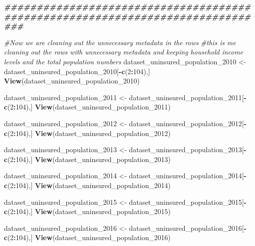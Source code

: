 \documentclass[
]{article}
\newenvironment{Shaded}{\begin{snugshade}}{\end{snugshade}}
\newcommand{\CommentTok}[1]{\textcolor[rgb]{0.56,0.35,0.01}{\textit{#1}}}
\newcommand{\DecValTok}[1]{\textcolor[rgb]{0.00,0.00,0.81}{#1}}
\newcommand{\DocumentationTok}[1]{\textcolor[rgb]{0.56,0.35,0.01}{\textbf{\textit{#1}}}}
\newcommand{\FunctionTok}[1]{\textcolor[rgb]{0.13,0.29,0.53}{\textbf{#1}}}
\newcommand{\NormalTok}[1]{#1}
\newcommand{\OtherTok}[1]{\textcolor[rgb]{0.56,0.35,0.01}{#1}}
\newcommand{\SpecialCharTok}[1]{\textcolor[rgb]{0.81,0.36,0.00}{\textbf{#1}}}
\begin{document}
\begin{Shaded}
\begin{Highlighting}[]
\DocumentationTok{\#\#\#\#\#\#\#\#\#\#\#\#\#\#\#\#\#\#\#\#\#\#\#\#\#\#\#\#\#\#\#\#\#\#\#\#\#\#\#\#\#\#\#\#\#\#\#\#\#\#\#\#\#\#\#\#\#\#\#\#\#\#\#\#\#\#\#\#\#\#\#\#\#\#\#\#\#\#\#}

\CommentTok{\#Now we are cleaning out the unnecessary metadata in the rows}
\CommentTok{\#this is me cleaning out the rows with unnecessary metadata and keeping household income levels and the total population numbers}
\NormalTok{dataset\_uninsured\_population\_2010 }\OtherTok{\textless{}{-}}\NormalTok{ dataset\_uninsured\_population\_2010[}\SpecialCharTok{{-}}\FunctionTok{c}\NormalTok{(}\DecValTok{2}\SpecialCharTok{:}\DecValTok{104}\NormalTok{),]}
\FunctionTok{View}\NormalTok{(dataset\_uninsured\_population\_2010)}

\NormalTok{dataset\_uninsured\_population\_2011 }\OtherTok{\textless{}{-}}\NormalTok{ dataset\_uninsured\_population\_2011[}\SpecialCharTok{{-}}\FunctionTok{c}\NormalTok{(}\DecValTok{2}\SpecialCharTok{:}\DecValTok{104}\NormalTok{),]}
\FunctionTok{View}\NormalTok{(dataset\_uninsured\_population\_2011)}

\NormalTok{dataset\_uninsured\_population\_2012 }\OtherTok{\textless{}{-}}\NormalTok{ dataset\_uninsured\_population\_2012[}\SpecialCharTok{{-}}\FunctionTok{c}\NormalTok{(}\DecValTok{2}\SpecialCharTok{:}\DecValTok{104}\NormalTok{),]}
\FunctionTok{View}\NormalTok{(dataset\_uninsured\_population\_2012)}

\NormalTok{dataset\_uninsured\_population\_2013 }\OtherTok{\textless{}{-}}\NormalTok{ dataset\_uninsured\_population\_2013[}\SpecialCharTok{{-}}\FunctionTok{c}\NormalTok{(}\DecValTok{2}\SpecialCharTok{:}\DecValTok{104}\NormalTok{),]}
\FunctionTok{View}\NormalTok{(dataset\_uninsured\_population\_2013)}

\NormalTok{dataset\_uninsured\_population\_2014 }\OtherTok{\textless{}{-}}\NormalTok{ dataset\_uninsured\_population\_2014[}\SpecialCharTok{{-}}\FunctionTok{c}\NormalTok{(}\DecValTok{2}\SpecialCharTok{:}\DecValTok{104}\NormalTok{),]}
\FunctionTok{View}\NormalTok{(dataset\_uninsured\_population\_2014)}

\NormalTok{dataset\_uninsured\_population\_2015 }\OtherTok{\textless{}{-}}\NormalTok{ dataset\_uninsured\_population\_2015[}\SpecialCharTok{{-}}\FunctionTok{c}\NormalTok{(}\DecValTok{2}\SpecialCharTok{:}\DecValTok{104}\NormalTok{),]}
\FunctionTok{View}\NormalTok{(dataset\_uninsured\_population\_2015)}

\NormalTok{dataset\_uninsured\_population\_2016 }\OtherTok{\textless{}{-}}\NormalTok{ dataset\_uninsured\_population\_2016[}\SpecialCharTok{{-}}\FunctionTok{c}\NormalTok{(}\DecValTok{2}\SpecialCharTok{:}\DecValTok{104}\NormalTok{),]}
\FunctionTok{View}\NormalTok{(dataset\_uninsured\_population\_2016)}


\end{Highlighting}
\end{Shaded}
\end{document}
